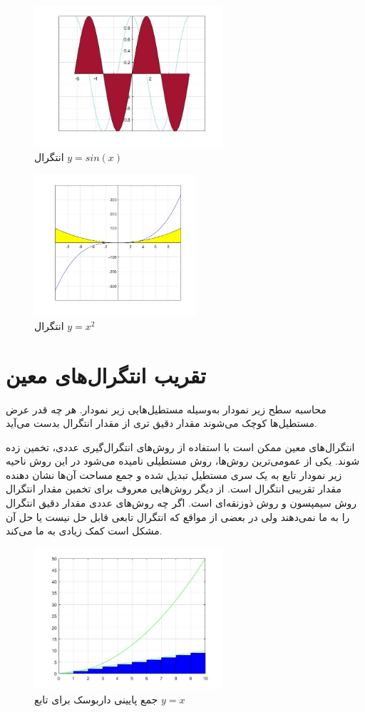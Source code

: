 \documentclass{article}
\begin{document}
\begin{figure}[!h]
    \centering
\includegraphics[width=7cm]{code3Integral3.jpg}
    \caption{انتگرال $y=sin(x)$}
    \label{fig:انتگرال خط}
\end{figure}


\begin{figure}[!h]
    \centering
\includegraphics[width=6cm]{x2.jpg}
    \caption{انتگرال $y=x^2$}
    \label{fig:انتگرال خط}
\end{figure}
\newpage
\section{تقریب انتگرال‌های معین}
محاسبه سطح زیر نمودار به‌وسیله مستطیل‌هایی زیر نمودار. هر چه قدر عرض مستطیل‌ها کوچک می‌شوند مقدار دقیق تری از مقدار انتگرال بدست می‌آید.


انتگرال‌های معین ممکن است با استفاده از روش‌های انتگرال‌گیری عددی، تخمین زده شوند. یکی از عمومی‌ترین روش‌ها، روش مستطیلی نامیده می‌شود در این روش ناحیه زیر نمودار تابع به یک سری مستطیل تبدیل شده و جمع مساحت آن‌ها نشان دهنده مقدار تقریبی انتگرال است. از دیگر روش‌هایی معروف برای تخمین مقدار انتگرال روش سیمپسون و روش ذوزنقه‌ای است. اگر چه روش‌های عددی مقدار دقیق انتگرال را به ما نمی‌دهند ولی در بعضی از مواقع که انتگرال تابعی قابل حل نیست یا حل آن مشکل است کمک زیادی به ما می‌کند.\citep{Numerical}


\begin{figure}[!h]
    \centering
\includegraphics[width=7cm]{pic6integral.jpg}
    \caption{
    جمع پایینی داربوسک برای تابع 
    $y=x$
    }
    \label{fig:انتگرال خط}
\end{figure}
\end{document}
